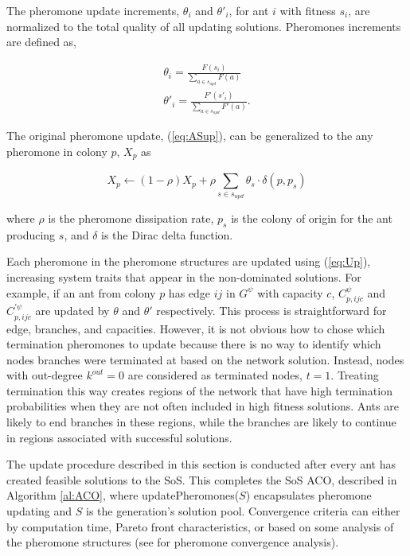 \documentclass[preprint,12pt,authoryear]{elsarticle}
\begin{document}
The pheromone update increments, $\theta_i$ and $\theta'_i$, for ant $i$ with fitness $s_i$, are normalized to the total quality of all updating solutions. Pheromones increments are defined as,

\begin{equation}
\begin{split}
\theta_i=\frac{F(s_i)}{\sum_{a\in s_{upd}}^{}F(a)}\\
\theta'_i=\frac{F'(s'_i)}{\sum_{a\in s_{upd}}^{}F'(a)}.
\end{split}
\label{eq:Inc}
\end{equation}

The original pheromone update, (\ref{eq:ASup}), can be generalized to the any pheromone in colony $p$, $X_p$ as

\begin{equation}
	X_p \leftarrow (1-\rho)X_p+\rho\sum_{s \in s_{upd}}^{}\theta_s\cdot\delta(p,p_s)
	\label{eq:Up}
\end{equation} 

\noindent where $\rho$ is the pheromone dissipation rate, $p_s$ is the colony of origin for the ant producing $s$, and $\delta$ is the Dirac delta function. 

Each pheromone in the pheromone structures are updated using (\ref{eq:Up}), increasing system traits that appear in the non-dominated solutions. For example, if an ant from colony $p$ has edge $ij$ in $G^\psi$ with capacity $c$, $C^\psi_{p,ijc}$ and $C^{'\psi}_{p,ijc}$ are updated by $\theta$ and $\theta'$ respectively. This process is straightforward for edge, branches, and capacities. However, it is not obvious how to chose which termination pheromones to update because there is no way to identify which nodes branches were terminated at based on the network solution. Instead, nodes with out-degree $k^{out}=0$ are considered as terminated nodes, $t=1$. Treating termination this way creates regions of the network that have high termination probabilities when they are not often included in high fitness solutions. Ants are likely to end branches in these regions, while the branches are likely to continue in regions associated with successful solutions. 

The update procedure described in this section is conducted after every ant has created feasible solutions to the SoS. This completes the SoS ACO, described in Algorithm \ref{al:ACO}, where updatePheromones($S$) encapsulates pheromone updating and $S$ is the generation's solution pool. Convergence criteria can either by computation time, Pareto front characteristics, or based on some analysis of the pheromone structures (see \cite{Stutzle2000} for pheromone convergence analysis).
\end{document}
